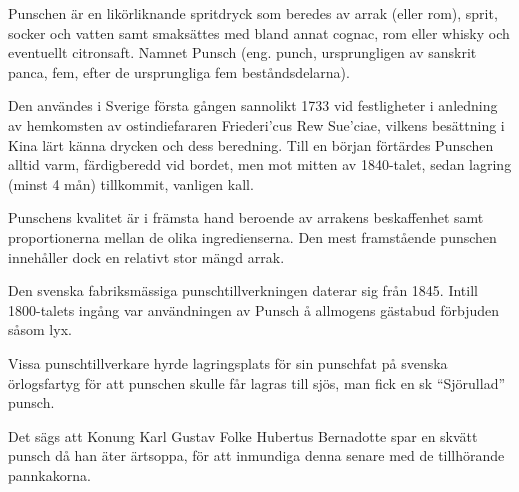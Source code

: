 \vspace{10pt}
Punschen är en likörliknande spritdryck som beredes av arrak (eller
rom), sprit, socker och vatten samt smaksättes med bland annat cognac,
rom eller whisky och eventuellt citronsaft. Namnet Punsch (eng. punch,
ursprungligen av sanskrit panca, fem, efter de ursprungliga fem
beståndsdelarna).\par \hspace{10pt}Den användes i Sverige första
gången sannolikt 1733 vid festligheter i anledning av hemkomsten av
ostindiefararen Friederi'cus Rew Sue'ciae, vilkens besättning i Kina
lärt känna drycken och dess beredning. Till en början förtärdes
Punschen alltid varm, färdigberedd vid bordet, men mot mitten av
1840-talet, sedan lagring (minst 4 mån) tillkommit, vanligen
kall.\par \hspace{10pt}Punschens kvalitet är i främsta hand beroende
av arrakens beskaffenhet samt proportionerna mellan de olika
ingredienserna. Den mest framstående punschen innehåller dock en
relativt stor mängd arrak.\par \hspace{10pt}Den svenska fabriksmässiga
punschtillverkningen daterar sig från 1845. Intill 1800-talets ingång
var användningen av Punsch å allmogens gästabud förbjuden såsom
lyx.\par \hspace{10pt}Vissa punschtillverkare hyrde lagringsplats för
sin punschfat på svenska örlogsfartyg för att punschen skulle får
lagras till sjös, man fick en sk ``Sjörullad''
punsch.\par \hspace{10pt}Det sägs att Konung Karl Gustav Folke
Hubertus Bernadotte spar en skvätt punsch då han äter ärtsoppa, för
att inmundiga denna senare med de tillhörande pannkakorna.
